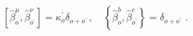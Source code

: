 \begin{equation}
\left[ \hat{\beta}_{o}^{\mu },\hat{\beta}_{o^{\prime }}^{\nu }\right]
=\kappa _{o}^{\prime }\delta _{o+o^{\prime }}\,,\quad \left\{ \hat{\beta}%
_{o}^{b},\hat{\beta}_{o^{\prime }}^{c}\right\} =\delta _{o+o^{\prime }}\,\,.
\end{equation}

